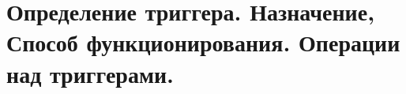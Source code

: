 {
	\section{Определение триггера. Назначение, Способ функционирования. Операции над триггерами.}
	\newpage
}
